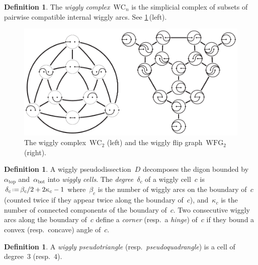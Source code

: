 \documentclass[submission]{FPSAC2025}
\theoremstyle{definition}
\newtheorem{definition}[theorem]{Definition}
\newcommand{\eqdef}{\mbox{\,\raisebox{0.2ex}{\scriptsize\ensuremath{\mathrm:}}\ensuremath{=}\,}} %
\newcommand{\darkblue}{\color{darkblue}} %
\newcommand{\defn}[1]{\textsl{\darkblue #1}} %
\newcommand{\wigglyComplex}{\mathrm{WC}} %
\newcommand{\wigglyFlipGraph}{\mathrm{WFG}} %
\begin{document}
\begin{definition}
\label{def:wigglyComplex}
The \defn{wiggly complex}~$\wigglyComplex_n$ is the simplicial complex of subsets of pairwise compatible internal wiggly arcs.
See \cref{fig:wigglyComplex}\,(left).

\begin{figure}
\centerline{\includegraphics[scale=1.1]{wigglyComplex}}
\caption{The wiggly complex~$\wigglyComplex_2$ (left) and the wiggly flip graph~$\wigglyFlipGraph_2$ (right).}
\label{fig:wigglyComplex}
\end{figure}
\end{definition}

\begin{definition}
A wiggly pseudodissection~$D$ decomposes the digon bounded by~$\alpha_\mathrm{top}$ and~$\alpha_\mathrm{bot}$ into \defn{wiggly cells}.
The \defn{degree}~$\delta_c$ of a wiggly cell~$c$ is~$\delta_c \eqdef \beta_c/2+2\kappa_c-1$ where~$\beta_c$ is the number of wiggly arcs on the boundary of~$c$ (counted twice if they appear twice along the boundary of~$c$), and~$\kappa_c$ is the number of connected components of the boundary of~$c$.
Two consecutive wiggly arcs along the boundary of~$c$ define a \defn{corner} (resp.~a \defn{hinge}) of~$c$ if they bound a convex (resp.~concave) angle of~$c$.
\end{definition}

\begin{definition}
A \defn{wiggly pseudotriangle} (resp.~\defn{pseudoquadrangle}) is a cell of degree~$3$ (resp.~$4$).
\end{definition}
\end{document}
